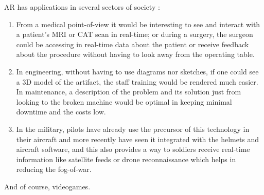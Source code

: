 \documentclass[runningheads]{llncs}
\begin{document}
\par AR has applications in several sectors of society \cite{ref_proc2,ref_article3}:
\begin{enumerate}
    \item From a medical point-of-view it would be interesting to see and interact with a patient's MRI or CAT scan in real-time; or during a surgery, the surgeon could be accessing in real-time data about the patient or receive feedback about the procedure without having to look away from the operating table.
    \item In engineering, without having to use diagrams nor sketches, if one could see a 3D model of the artifact, the staff training would be rendered much easier. In maintenance, a description of the problem and its solution just from looking to the broken machine would be optimal in keeping minimal downtime and the costs low. 
    \item In the military, pilots have already use the precursor of this technology in their aircraft and more recently have seen it integrated with the helmets and aircraft software, and this also provides a way to soldiers receive real-time information like satellite feeds or drone reconnaissance which helps in reducing the fog-of-war.
\end{enumerate}
And of course, videogames.
\end{document}
